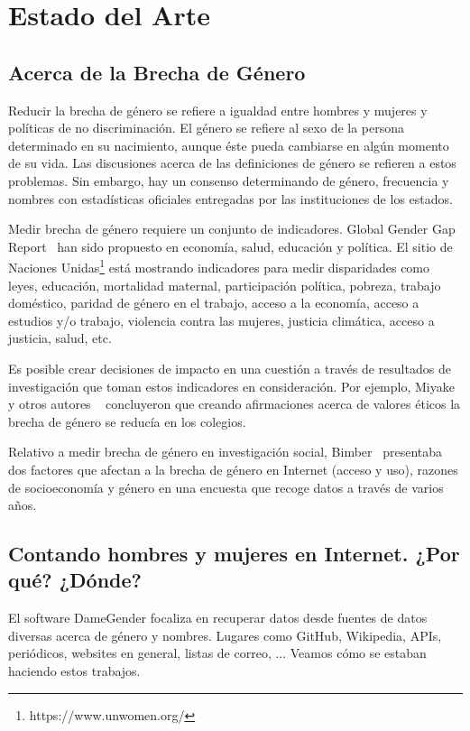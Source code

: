 \documentclass[a4paper]{article}
\begin{document}
\section{Estado del Arte}
\label{sec:stateofart}

\subsection{Acerca de la Brecha de Género}

Reducir la brecha de género se refiere a igualdad entre hombres y mujeres
y políticas de no discriminación. El género se refiere al sexo de la
persona determinado en su nacimiento, aunque éste pueda cambiarse en
algún momento de su vida. Las discusiones acerca de las definiciones
de género se refieren a estos problemas. Sin embargo, hay un consenso
determinando de género, frecuencia y nombres con estadísticas oficiales
entregadas por las instituciones de los estados.

Medir brecha de género requiere un conjunto de indicadores. Global Gender
Gap Report~\cite{chancel2022world} han sido propuesto en economía, salud,
educación y política. El sitio de Naciones Unidas\footnote{https://www.unwomen.org/}
está mostrando indicadores para medir disparidades como leyes, educación,
mortalidad maternal, participación política, pobreza, trabajo doméstico,
paridad de género en el trabajo, acceso a la economía, acceso a estudios
y/o trabajo, violencia contra las mujeres, justicia climática, acceso a
justicia, salud, etc.

Es posible crear decisiones de impacto en una cuestión a través de resultados
de investigación que toman estos indicadores en consideración. Por ejemplo,
Miyake y otros autores ~\cite{miyake2010reducing} concluyeron que creando
afirmaciones acerca de valores éticos la brecha de género se reducía en
los colegios.

Relativo a medir brecha de género en investigación social,
Bimber~\cite{bimber2000measuring} presentaba dos factores que afectan
a la brecha de género en Internet (acceso y uso), razones de socioeconomía
y género en una encuesta que recoge datos a través de varios años.

\subsection{Contando hombres y mujeres en Internet. ¿Por qué? ¿Dónde?}

El software DameGender focaliza en recuperar datos desde fuentes de datos
diversas acerca de género y nombres. Lugares como GitHub, Wikipedia, APIs,
periódicos, websites en general, listas de correo, ... Veamos cómo se
estaban haciendo estos trabajos.
\end{document}
